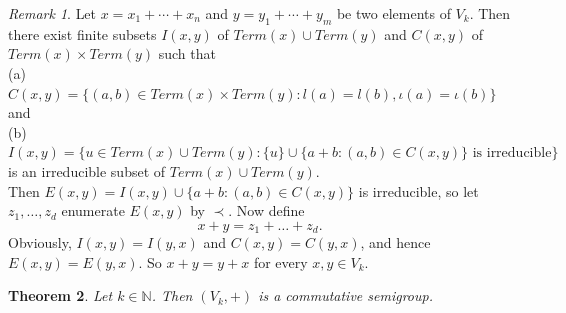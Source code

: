 \documentclass{amsart}
\newtheorem{theorem}{Theorem}[section]
\theoremstyle{definition}
\theoremstyle{remark}
\newtheorem{remark}[theorem]{Remark}
\numberwithin{equation}{section}
\begin{document}
\begin{remark}{\label{3.44}}
	Let $x=x_1+\cdots+x_n$ and $y=y_1+\cdots+y_m$ be two elements of $V_k$. Then there exist finite subsets $I(x,y)$ of $Term(x)\cup Term(y)$ and $C(x,y)$ of $Term(x)\times Term(y)$ such that\\
(a) $C(x,y)=\{(a,b)\in Term(x)\times Term(y):l(a)=l(b),\iota(a)=\iota(b)\}$ and \\
(b) $I(x,y)=\{u\in Term(x)\cup Term(y): \{u\}\cup\{a+b:(a,b)\in C(x,y)\}\mbox{ is irreducible}\}$ is an irreducible subset of $Term(x)\cup Term(y)$. \\
	Then $E(x,y)=I(x,y)\cup \{a+b:(a,b)\in C(x,y)\}$ is irreducible, so let $z_1,\ldots,z_d$ enumerate $E(x,y)$ by $\prec$. Now define 
	\[
	x+y=z_1+\ldots+z_d.
	\]  
	Obviously, $I(x,y)=I(y,x)$ and $C(x,y)=C(y,x)$, and hence $E(x,y)=E(y,x)$. So $x+y=y+x$ for every $x,y\in V_k$.
\end{remark}
\begin{theorem}{\label{3.66}}
	Let $k\in\mathbb{N}$. Then $(V_k,+)$ is a commutative semigroup.
\end{theorem}
\end{document}
